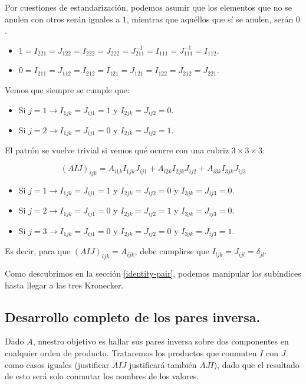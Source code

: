 Por cuestiones de estandarización, podemos asumir que los elementos que no se anulen con otros serán iguales a $1$, mientras que aquéllos que sí se anulen, serán $0$.

\begin{itemize}
	\item $1 = I_{221} = J_{122} = I_{222} = J_{222} = J_{211}^{-1} = I_{111} = J_{111}^{-1} = I_{112}$.
	\item $0 = I_{211} = J_{112} = I_{212} = I_{121} = J_{121} = I_{122} = J_{212} = J_{221}$.
\end{itemize}

Vemos que siempre se cumple que:

\begin{itemize}
	\item Si $j = 1 \rightarrow I_{1jk} = J_{ij1} = 1$ y $I_{2jk} = J_{ij2} = 0$.
	\item Si $j = 2 \rightarrow I_{1jk} = J_{ij1} = 0$ y $I_{2jk} = J_{ij2} = 1$.
\end{itemize}

El patrón se vuelve trivial si vemos qué ocurre con una cubriz $3 \times 3 \times 3$:

$$(AIJ)_{ijk} = A_{i1k} I_{1jk} J_{ij1} + A_{i2k} I_{2jk} J_{ij2} + A_{i3k} I_{3jk} J_{ij3}$$

\begin{itemize}
	\item Si $j = 1 \rightarrow I_{1jk} = J_{ij1} = 1$ y $I_{2jk} = J_{ij2} = 0$ y $I_{3jk} = J_{ij3} = 0$.
	\item Si $j = 2 \rightarrow I_{1jk} = J_{ij1} = 0$ y $I_{2jk} = J_{ij2} = 1$ y $I_{3jk} = J_{ij3} = 0$.
	\item Si $j = 3 \rightarrow I_{1jk} = J_{ij1} = 0$ y $I_{2jk} = J_{ij2} = 0$ y $I_{3jk} = J_{ij3} = 1$.
\end{itemize}

Es decir, para que $(AIJ)_{ijk} = A_{ijk}$, debe cumplirse que $I_{ljk} = J_{ijl} = \delta_{jl}$.

Como descubrimos en la sección \ref{identity-pair}, podemos manipular los subíndices hasta llegar a las tres Kronecker.

\subsection{Desarrollo completo de los pares inversa.} \label{appendix-3}

Dado $A$, nuestro objetivo es hallar sus pares inversa sobre dos componentes en cualquier orden de producto. Trataremos los productos que conmuten $I$ con $J$ como casos iguales (justificar $AIJ$ justificará también $AJI$), dado que el resultado de esto será solo conmutar los nombres de los valores.

